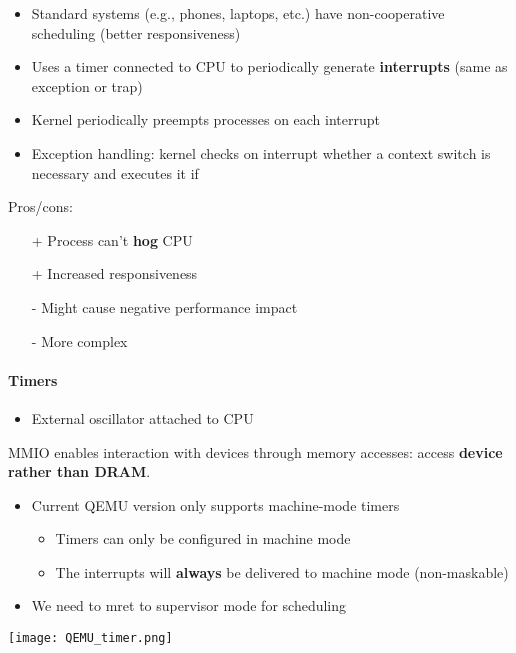 \newpar{}
\begin{itemize}
    \item Standard systems (e.g., phones, laptops, etc.) have non-cooperative scheduling (better responsiveness)
    \item Uses a timer connected to CPU to periodically generate \textbf{interrupts} (same as exception or trap)
    \item Kernel periodically preempts processes on each interrupt
    \item Exception handling: kernel checks on interrupt whether a context switch is necessary and executes it if
\end{itemize}
Pros/cons:
\begin{itemize}
    \item[+] Process can't \textbf{hog} CPU
    \item[+] Increased responsiveness
    \item[-] Might cause negative performance impact
    \item[-] More complex
\end{itemize}

\paragraph{Timers}
\begin{itemize}
    \item External oscillator attached to CPU
\end{itemize}

\newpar{}

MMIO enables interaction with devices through memory accesses: access \textbf{device rather than DRAM}.

\newpar{}

\begin{itemize}
    \item Current QEMU version only supports machine-mode timers
          \begin{itemize}
              \item Timers can only be configured in machine mode
              \item The interrupts will \textbf{always} be delivered to machine mode (non-maskable)
          \end{itemize}
    \item We need to mret to supervisor mode for scheduling
\end{itemize}
\begin{center}
    \texttt{[image: QEMU\_timer.png]}
\end{center}

